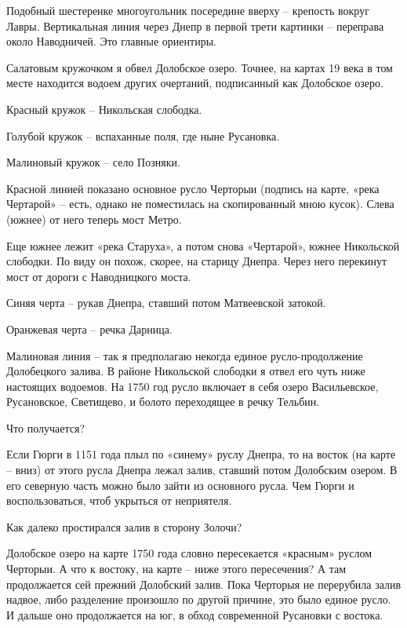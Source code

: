 
Подобный шестеренке многоугольник посередине вверху – крепость вокруг Лавры. Вертикальная линия через Днепр в первой трети картинки – переправа около Наводничей. Это главные ориентиры.

Салатовым кружочком я обвел Долобское озеро. Точнее, на картах 19 века в том месте находится водоем других очертаний, подписанный как Долобское озеро.

Красный кружок – Никольская слободка.

Голубой кружок – вспаханные поля, где ныне Русановка.

Малиновый кружок – село Позняки.

Красной линией показано основное русло Черторыи (подпись на карте, «река Чертарой» – есть, однако не поместилась на скопированный мною кусок). Слева (южнее) от него теперь мост Метро. 

Еще южнее лежит «река Старуха», а потом снова «Чертарой», южнее Никольской слободки. По виду он похож, скорее, на старицу Днепра. Через него перекинут мост от дороги с Наводницкого моста. 

Синяя черта – рукав Днепра, ставший потом Матвеевской затокой.

Оранжевая черта – речка Дарница.

Малиновая линия – так я предполагаю некогда единое русло-продолжение Долобецкого залива. В районе Никольской слободки я отвел его чуть ниже настоящих водоемов. На 1750 год русло включает в себя озеро Васильевское, Русановское, Светищево, и болото переходящее в речку Тельбин.
 
Что получается? 

Если Гюрги в 1151 года плыл по «синему» руслу Днепра, то на восток (на карте – вниз) от этого русла Днепра лежал залив, ставший потом Долобским озером. В его северную часть можно было зайти из основного русла. Чем Гюрги и воспользоваться, чтоб укрыться от неприятеля.

Как далеко простирался залив в сторону Золочи?

Долобское озеро на карте 1750 года словно пересекается «красным» руслом Черторыи. А что к востоку, на карте – ниже этого пересечения? А там продолжается сей прежний Долобский залив. Пока Черторыя не перерубила залив надвое, либо разделение произошло по другой причине, это было единое русло. И дальше оно продолжается на юг, в обход современной Русановки с востока. 

